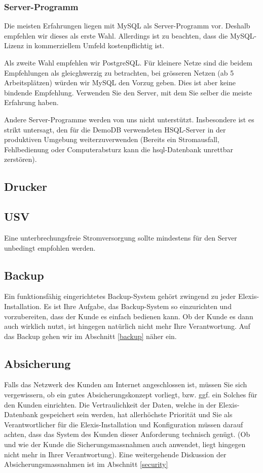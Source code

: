 \documentclass[paper=a4,BCOR8.25mm,twoside]{scrartcl}
\begin{document}
\subsubsection{Server-Programm}
Die meisten Erfahrungen liegen mit MySQL als Server-Programm vor. Deshalb empfehlen wir dieses als erste Wahl. Allerdings ist zu beachten, dass die MySQL-Lizenz in kommerziellem Umfeld kostenpflichtig ist.

Als zweite Wahl empfehlen wir PostgreSQL. Für kleinere Netze sind die beidem Empfehlungen als gleicghwerzig zu betrachten, bei grösseren Netzen (ab 5 Arbeitsplätzen) würden wir MySQL den Vorzug geben. Dies ist aber keine bindende Empfehlung. Verwenden Sie den Server, mit dem Sie selber die meiste Erfahrung haben.

Andere Server-Programme werden von uns nicht unterstützt. 
Insbesondere ist es strikt untersagt, den für die DemoDB verwendeten HSQL-Server in der produktiven Umgebung weiterzuverwenden (Bereits ein Stromausfall, Fehlbedienung oder Computerabsturz kann die hsql-Datenbank unrettbar zerstören).

\subsection{Drucker}

\subsection{USV}
Eine unterbrechungsfreie Stromversorgung sollte mindestens für den Server unbedingt empfohlen werden.

\subsection{Backup}
Ein funktionsfähig eingerichtetes Backup-System gehört zwingend zu jeder Elexis-Installation. Es ist Ihre Aufgabe, das Backup-System so einzurichten und vorzubereiten, dass der Kunde es einfach bedienen kann. Ob der Kunde es dann auch wirklich nutzt, ist hingegen natürlich nicht mehr Ihre Verantwortung. Auf das Backup gehen wir im Abschnitt \ref{backup} näher ein.

\subsection{Absicherung}
Falls das Netzwerk des Kunden am Internet angeschlossen ist, müssen Sie sich vergewissern, ob ein gutes Absicherungskonzept vorliegt, bzw. ggf. ein Solches für den Kunden einrichten. Die Vertraulichkeit der Daten, welche in der Elexis-Datenbank gespeichert sein werden, hat allerhöchste Priorität und Sie als Verantwortlicher für die Elexis-Installation und Konfiguration müssen darauf achten, dass das System des Kunden dieser Anforderung technisch genügt. (Ob und wie der Kunde die Sicherungsmassnahmen auch anwendet, liegt hingegen nicht mehr in Ihrer Verantwortung). Eine weitergehende Diskussion der Absicherungsmassnahmen ist im Abschnitt \ref{security}
\end{document}
